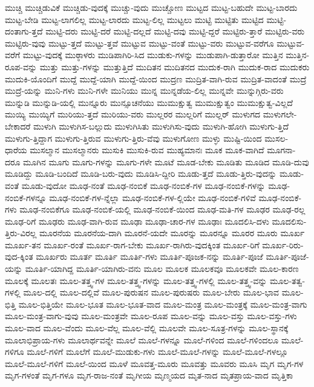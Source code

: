 {ಮುಚ್ಚಿ
ಮುಚ್ಚಿಡುವಿಕೆ
ಮುಚ್ಚಿಡು-ವುದಕ್ಕೆ
ಮುಚ್ಚು-ವುದು
ಮುಚ್ಚೋಣ
ಮುಟ್ಟದ
ಮುಟ್ಟ-ಬಹುದೇ
ಮುಟ್ಟ-ಬಾರದು
ಮುಟ್ಟ-ಬೇಡಿ
ಮುಟ್ಟ-ಲಾಗಲಿಲ್ಲ
ಮುಟ್ಟ-ಲಾರದು
ಮುಟ್ಟ-ಲಿಲ್ಲ
ಮುಟ್ಟಲು
ಮುಟ್ಟಿ
ಮುಟ್ಟಿತು
ಮುಟ್ಟಿದ
ಮುಟ್ಟಿ-ದಂತಾಗು-ತ್ತದೆ
ಮುಟ್ಟಿ-ದರು
ಮುಟ್ಟಿ-ದರೆ
ಮುಟ್ಟಿ-ದಲ್ಲದೆ
ಮುಟ್ಟಿ-ದವು
ಮುಟ್ಟಿ-ದ್ದರೆ
ಮುಟ್ಟಿರು-ತ್ತಾರೆ
ಮುಟ್ಟಿರು-ವರು
ಮುಟ್ಟಿರು-ವುವು
ಮುಟ್ಟು-ತ್ತದೆ
ಮುಟ್ಟು-ತ್ತವೆ
ಮುಟ್ಟುವ
ಮುಟ್ಟು-ವಂತೆ
ಮುಟ್ಟು-ವರು
ಮುಟ್ಟುವ-ವರೆಗೂ
ಮುಟ್ಟುವ-ವರೆಗೆ
ಮುಟ್ಟು-ವುದಕ್ಕೆ
ಮುಠ್ಠಾಳರು
ಮುಡಿಪಾಗಿರಿ-ಸಿದ
ಮುಡುಕು-ಗಳನ್ನು
ಮುಡುಪಾಗಿ-ಡುತ್ತಾರೋ
ಮುತ್ತಿನ
ಮುತ್ತಿನ-ರೂಪ-ವನ್ನು
ಮುತ್ತು
ಮುತ್ತು-ಗಳನ್ನು
ಮುತ್ತುತ್ತಿದೆ
ಮುದಿತನ
ಮುದಿತನದ
ಮುದುಕ-ರಾಗಿ
ಮುದುಕ-ರಾದ
ಮುದುಕರು
ಮುದುಕಿ-ಯೊಂದಿಗೆ
ಮುದ್ದೆ
ಮುದ್ದೆ-ಯಾಗಿ
ಮುದ್ದೆ-ಯಿಂದ
ಮುದ್ರಣ
ಮುದ್ರಿತ-ವಾಗಿ-ರುವ
ಮುದ್ರಿತ-ವಾದಂತೆ
ಮುದ್ರೆ
ಮುದ್ರೆ-ಯನ್ನು
ಮುನಿ-ಗಳು
ಮುನಿ-ಗಳೇ
ಮುನಿಯು
ಮುನ್ನ
ಮುನ್ನಡೆಯ-ಲಿಲ್ಲ
ಮುನ್ನವೇ
ಮುನ್ನುಗ್ಗಿರು-ವರು
ಮುನ್ನುಡಿ
ಮುನ್ನುಡಿ-ಯಲ್ಲಿ
ಮುನ್ನೂರು
ಮುನ್ಸೂಚನೆಯು
ಮುಮುಕ್ಷುತ್ವ
ಮುಮುಕ್ಷುತ್ವಂ
ಮುಮುಕ್ಷುತ್ವ-ವಿಲ್ಲದೆ
ಮುಯ್ಯಿ
ಮುಯ್ಯಿಗೆ
ಮುರಿಯು-ತ್ತದೆ
ಮುರಿಯು-ವರು
ಮುಲ್ಲರರ
ಮುಲ್ಲರಿಗೆ
ಮುಲ್ಲರ್
ಮುಳುಗದ
ಮುಳುಗಲೇ-ಬೇಕಾದರೆ
ಮುಳುಗಿ
ಮುಳುಗಿಸ-ಬಲ್ಲುದು
ಮುಳುಗಿಸಿತು
ಮುಳುಗಿಸು-ವುದು
ಮುಳುಗಿ-ಹೋಗಿ
ಮುಳುಗು-ತ್ತಿದೆ
ಮುಳುಗು-ತ್ತಿದ್ದಾಗ
ಮುಳುಗು-ತ್ತಿರುವ
ಮುಳುಗು-ತ್ತಿರು-ವೆವು
ಮುಳುಗೋಣ
ಮುಳ್ಳು
ಮುಷ್ಟಿ-ಯಿಂದ
ಮುಸಲ-ಧಾರೆಯ
ಮುಸಲ್ಮಾನ
ಮುಸಲ್ಮಾನರು
ಮುಸುಕಿ
ಮುಸುಕಿ-ರುವ
ಮುಹ್ಯಮಾನಃ
ಮೂಕ
ಮೂಕ-ವಾಗಿದೆ
ಮೂಗನಾ-ದರೂ
ಮೂಗಿನ
ಮೂಗು
ಮೂಗು-ಗಳನ್ನು
ಮೂಗು-ಗಳೇ
ಮೂಟೆ
ಮೂಡ-ಬೇಕು
ಮೂಡಿತು
ಮೂಡಿದ
ಮೂಡಿ-ದುವು
ಮೂಡಿದ್ದು
ಮೂಡಿ-ಬಂದಿದೆ
ಮೂಡಿ-ಬರು-ವುದು
ಮೂಡಿಸಿ-ದ್ದೀರಿ
ಮೂಡು-ತ್ತದೆ
ಮೂಡು-ತ್ತಿರು-ವುದನ್ನು
ಮೂಡು-ವಂತೆ
ಮೂಡು-ವುದೋ
ಮೂಢ-ನಂತೆ
ಮೂಢ-ನಂಬಿಕೆ
ಮೂಢ-ನಂಬಿಕೆ-ಗಳ
ಮೂಢ-ನಂಬಿಕೆ-ಗಳನ್ನು
ಮೂಢ-ನಂಬಿಕೆ-ಗಳನ್ನೂ
ಮೂಢ-ನಂಬಿಕೆ-ಗಳ-ನ್ನೆಲ್ಲಾ
ಮೂಢ-ನಂಬಿಕೆ-ಗಳ-ಲ್ಲಿಯೇ
ಮೂಢ-ನಂಬಿಕೆ-ಗಳಿವೆ
ಮೂಢ-ನಂಬಿಕೆ-ಗಳು
ಮೂಢ-ನಂಬಿಕೆಗೂ
ಮೂಢ-ನಂಬಿಕೆ-ಯಲ್ಲಿ
ಮೂಢ-ನಂಬಿಕೆ-ಯಿಂದ
ಮೂಢ-ಮತಿ-ಗಳ
ಮೂಢರ
ಮೂಢ-ರಲ್ಲ
ಮೂಢ-ರಿಗೆ
ಮೂಢರು
ಮೂಢ-ವಾಗಿ-ರುವ
ಮೂಢಾ
ಮೂಢಾ-ಚಾರ-ಗಳ
ಮೂಢಾಃ
ಮೂದಲಿಸಿ-ದಳು
ಮೂದಲಿಸು-ತ್ತಿರು-ವಿರಲ್ಲ
ಮೂರನೆಯ
ಮೂರನೆಯ-ದಾಗಿ
ಮೂರನೆ-ಯದೇ
ಮೂರನ್ನು
ಮೂರನ್ನೂ
ಮೂರರ
ಮೂರು
ಮೂರ್ಖ
ಮೂರ್ಖ-ತನ
ಮೂರ್ಖ-ರಂತೆ
ಮೂರ್ಖ-ರಾಗ-ಬೇಕು
ಮೂರ್ಖ-ರಾಗಿರು-ವುದಕ್ಕಿಂತ
ಮೂರ್ಖ-ರಿಗೆ
ಮೂರ್ಖ-ರಿರು-ವುದ-ಕ್ಕಿಂತ
ಮೂರ್ಖರು
ಮೂರ್ತ
ಮೂರ್ತಿ
ಮೂರ್ತಿ-ಗಳು
ಮೂರ್ತಿ-ಪೂಜಕ-ನನ್ನು
ಮೂರ್ತಿ-ಪೂಜೆ
ಮೂರ್ತಿ-ಪೂಜೆ-ಯನ್ನು
ಮೂರ್ತಿ-ಯಾಗಿದ್ದ
ಮೂರ್ತಿ-ಯಾಗಿರು-ವನು
ಮೂಲ
ಮೂಲಕ
ಮೂಲಕವೂ
ಮೂಲಕವೇ
ಮೂಲ-ಕಾರಣ
ಮೂಲಕ್ಕೆ
ಮೂಲತಃ
ಮೂಲ-ತತ್ತ್ವ-ಗಳ
ಮೂಲ-ತತ್ತ್ವ-ಗಳನ್ನು
ಮೂಲ-ತತ್ತ್ವ-ಗಳಲ್ಲಿ
ಮೂಲ-ತತ್ತ್ವ-ವನ್ನು
ಮೂಲ-ತತ್ವ-ಗಳಲ್ಲಿ
ಮೂಲ-ದಲ್ಲಿ
ಮೂಲ-ದಲ್ಲಿವೆ
ಮೂಲ-ಪುರುಷನ
ಮೂಲ-ಪುರುಷರು
ಮೂಲ-ಬೇರು
ಮೂಲ-ಭಾವ
ಮೂಲ-ಭಿತ್ತಿ
ಮೂಲ-ಭಿತ್ತಿಯೇ
ಮೂಲ-ಭೂತ
ಮೂಲ-ಭೂತ-ವಾದ
ಮೂಲ-ಮಂತ್ರ
ಮೂಲ-ಮಂತ್ರಕ್ಕೆ
ಮೂಲ-ಮಂತ್ರ-ವಾಗು
ಮೂಲ-ಮಂತ್ರ-ವಾಗು-ವುವು
ಮೂಲ-ಮಂತ್ರವೇ
ಮೂಲ-ರೂಪ
ಮೂಲ-ವನ್ನು
ಮೂಲ-ವಸ್ತು
ಮೂಲ-ವಸ್ತು-ಗಳು
ಮೂಲ-ವಾದ
ಮೂಲ-ವೆಂದು
ಮೂಲ-ವೆಲ್ಲ
ಮೂಲ-ವೆಲ್ಲಿ
ಮೂಲವೇ
ಮೂಲ-ಸೂತ್ರ-ಗಳನ್ನು
ಮೂಲ-ಸ್ಥಾನಕ್ಕೆ
ಮೂಲಾಭಿಪ್ರಾಯ-ಗಳು
ಮೂಲಾರ್ಥವನ್ನೇ
ಮೂಲೆ
ಮೂಲೆ-ಗಳನ್ನೂ
ಮೂಲೆ-ಗಳಿಂದ
ಮೂಲೆ-ಗಳಿಂದಲೂ
ಮೂಲೆ-ಗಳಿಗೂ
ಮೂಲೆ-ಗಳಿಗೆ
ಮೂಲೆಗೆ
ಮೂಲೆ-ಮುಡುಕು-ಗಳು
ಮೂಲೆ-ಮೂಲೆ-ಗಳನ್ನು
ಮೂಲೆ-ಮೂಲೆ-ಗಳಲ್ಲೂ
ಮೂಲೆ-ಮೂಲೆ-ಗಳಿಗೆ
ಮೂಲೆ-ಯಿಂದ
ಮೂಳೆ
ಮೂವತ್ತ-ಮೂರು
ಮೂವತ್ತು
ಮೂವರು
ಮೂಸಿ
ಮೃಗ
ಮೃಗ-ಗಳ
ಮೃಗ-ಗಳಂತೆ
ಮೃಗ-ಗಳೂ
ಮೃಗ-ರಾಜ-ನಂತೆ
ಮೃಗೀಯ
ಮೃಣ್ಮಯದ
ಮೃತ-ನಾದ
ಮೃತಪ್ರಾಯ-ವಾದ
ಮೃತ್ತಿಕಾ
}
